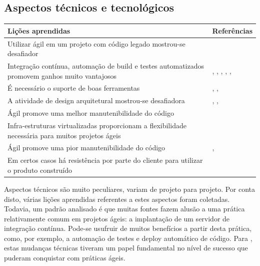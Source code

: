 \subsection{Aspectos técnicos e tecnológicos}

\begin{table}[H]
	\centering
	\begin{tabularx}{\linewidth}{ | X | p{5cm} | } \hline \textbf{Lições aprendidas} & \textbf{Referências} \\ \hline
		Utilizar ágil em um projeto com código legado mostrou-se desafiador & \cite{Block2011} \\ \hline
		Integração contínua, automação de build e testes automatizados promovem ganhos muito vantajosos & \cite{Block2011}, \cite{Microsoft2013}, \cite{Korhonen2010}, \cite{Cisco2011}, \cite{Lapham2012}, \cite{Eunha2012} \\ \hline
		É necessário o suporte de boas ferramentas & \cite{Fitzgerald2013}, \cite{Microsoft2013}, \cite{Arikpo2011} \\ \hline
		A atividade de design arquitetural mostrou-se desafiadora & \cite{Bustard2013}, \cite{Radha2012}, \cite{Piegas2012} \\ \hline
		Ágil promove uma melhor manutenibilidade do código & \cite{Bustard2013} \\ \hline
		Infra-estruturas virtualizadas proporcionam a flexibilidade necessária para muitos projetos ágeis & \cite{Radha2012} \\ \hline
		Ágil promove uma pior manutenibilidade do código & \cite{Nokia2013}, \cite{Queiroz2013} \\ \hline
		Em certos casos há resistência por parte do cliente para utilizar o produto construído & \cite{Stefano2013} \\ \hline
	\end{tabularx}
\end{table}

Aspectos técnicos são muito peculiares, variam de projeto para projeto. Por conta disto, várias lições aprendidas referentes a estes aspectos foram coletadas. Todavia, um padrão analisado é que muitas fontes fazem alusão a uma prática relativamente comum em projetos ágeis: a implantação de um servidor de integração contínua. Pode-se usufruir de muitos benefícios a partir desta prática, como, por exemplo, a automação de testes e deploy automático de código. Para \cite{Block2011}, estas mudanças técnicas tiveram um papel fundamental no nível de sucesso que puderam conquistar com práticas ágeis.

